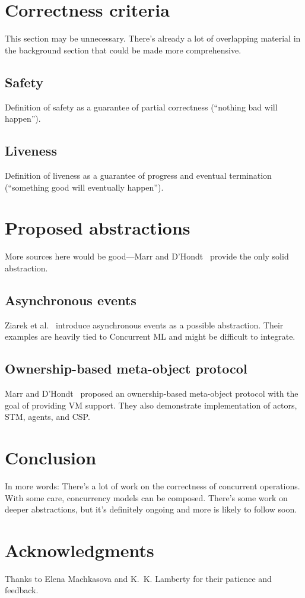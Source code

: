 \documentclass{sig-alternate}
\begin{document}
\section{Correctness criteria}

This section may be unnecessary. There's already a lot of overlapping material in the background section that could be made more comprehensive.

\subsection{Safety}

Definition of safety as a guarantee of partial correctness (``nothing bad will happen'').

\subsection{Liveness}

Definition of liveness as a guarantee of progress and eventual termination (``something good will eventually happen'').

\section{Proposed abstractions}

More sources here would be good---Marr and D'Hondt~\cite{Marr2012} provide the only solid abstraction.

\subsection{Asynchronous events}

Ziarek et al.~\cite{Ziarek2011} introduce asynchronous events as a possible abstraction. Their examples are heavily tied to Concurrent ML and might be difficult to integrate.

\subsection{Ownership-based meta-object protocol}

Marr and D'Hondt~\cite{Marr2012} proposed an ownership-based meta-object protocol with the goal of providing VM support. They also demonstrate implementation of actors, STM, agents, and CSP.

\section{Conclusion}

In more words: There's a lot of work on the correctness of concurrent operations. With some care, concurrency models can be composed. There's some work on deeper abstractions, but it's definitely ongoing and more is likely to follow soon.

\section*{Acknowledgments}

Thanks to Elena Machkasova and K.~K. Lamberty for their patience and feedback.

\printbibliography{}
\end{document}
